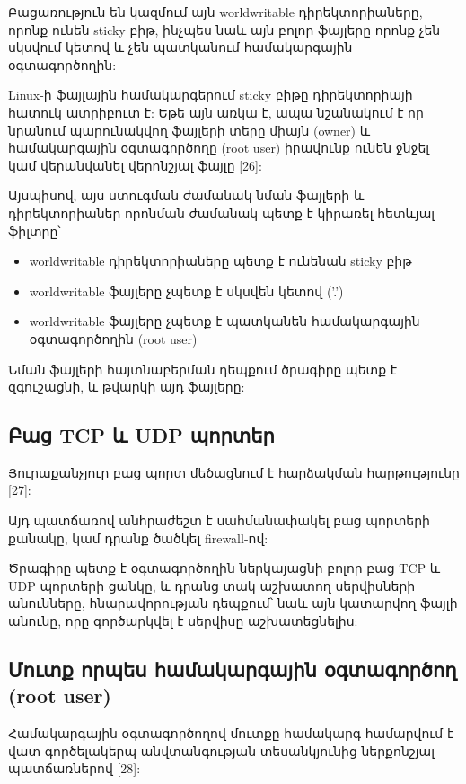 \documentclass[a4paper,12pt]{article}
\begin{document}
\begin{sloppypar}
Բացառություն են կազմում այն worldwritable դիրեկտորիաները, որոնք ունեն
sticky բիթ, ինչպես նաև այն բոլոր ֆայլերը որոնք չեն սկսվում կետով և չեն
պատկանում համակարգային օգտագործողին:

Linux-ի ֆայլային համակարգերում sticky բիթը դիրեկտորիայի հատուկ ատրիբուտ է:
Եթե այն առկա է, ապա նշանակում է որ նրանում պարունակվող ֆայլերի տերը միայն (owner)
և համակարգային օգտագործողը (root user) իրավունք ունեն ջնջել կամ վերանվանել
վերոնշյալ ֆայլը [26]:

Այսպիսով, այս ստուգման ժամանակ նման ֆայլերի և դիրեկտորիաներ որոնման ժամանակ
պետք է կիրառել հետևյալ ֆիլտրը՝

\begin{itemize}
\item worldwritable դիրեկտորիաները պետք է ունենան sticky բիթ
\item worldwritable ֆայլերը չպետք է սկսվեն կետով ('.')
\item worldwritable ֆայլերը չպետք է պատկանեն համակարգային օգտագործողին
	(root user)
\end{itemize}

Նման ֆայլերի հայտնաբերման դեպքում ծրագիրը պետք է զգուշացնի,
և թվարկի այդ ֆայլերը:


\subsection{Բաց TCP և UDP պորտեր}


Յուրաքանչյուր բաց պորտ մեծացնում է հարձակման հարթությունը [27]:

Այդ պատճառով անհրաժեշտ է սահմանափակել բաց պորտերի քանակը,
կամ դրանք ծածկել firewall-ով:

Ծրագիրը պետք է օգտագործողին ներկայացնի բոլոր բաց 
TCP և UDP պորտերի ցանկը, և դրանց տակ աշխատող սերվիսների
անունները, հնարավորության դեպքում՝ նաև այն կատարվող
ֆայլի անունը, որը գործարկվել է սերվիսը աշխատեցնելիս:


\subsection{Մուտք որպես համակարգային օգտագործող (root user)}


Համակարգային օգտագործողով մուտքը համակարգ համարվում է վատ
գործելակերպ անվտանգության տեսանկյունից ներքոնշյալ պատճառներով [28]:


\end{sloppypar}
\end{document}
